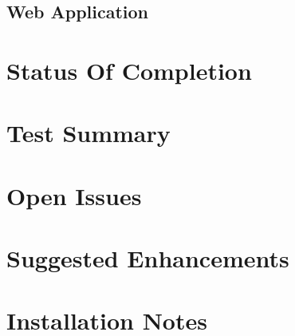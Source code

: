 \documentclass[11pt]{report} %
\begin{document}
\section{Web Application}

\chapter{Status Of Completion}

\chapter{Test Summary}
\chapter{Open Issues}
\chapter{Suggested Enhancements}
\chapter{Installation Notes}
\end{document}
